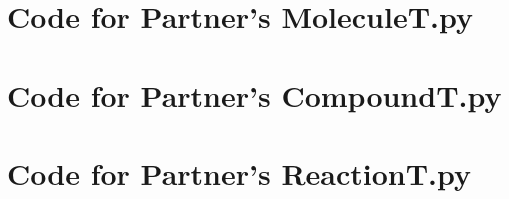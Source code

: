\documentclass[12pt]{article}
\begin{document}
\newpage

\section{Code for Partner's MoleculeT.py}

\noindent 

\newpage

\section{Code for Partner's CompoundT.py}

\noindent 

\newpage

\section{Code for Partner's ReactionT.py}

\noindent 
\end{document}
